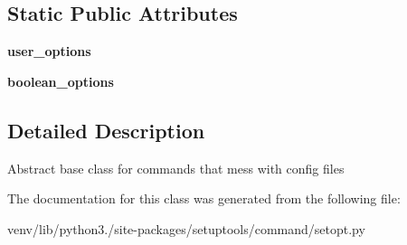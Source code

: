 \subsection*{Static Public Attributes}
\begin{DoxyCompactItemize}
\item 
\mbox{\label{classsetuptools_1_1command_1_1setopt_1_1option__base_a18ec73309f28690ca2d84069308cfc3e}} 
{\bfseries user\+\_\+options}
\item 
\mbox{\label{classsetuptools_1_1command_1_1setopt_1_1option__base_a286dca4e0d14105a8f5501d69a818dbd}} 
{\bfseries boolean\+\_\+options}
\end{DoxyCompactItemize}


\subsection{Detailed Description}
\begin{DoxyVerb}Abstract base class for commands that mess with config files\end{DoxyVerb}
 

The documentation for this class was generated from the following file\+:\begin{DoxyCompactItemize}
\item 
venv/lib/python3./site-\/packages/setuptools/command/setopt.\+py\end{DoxyCompactItemize}
